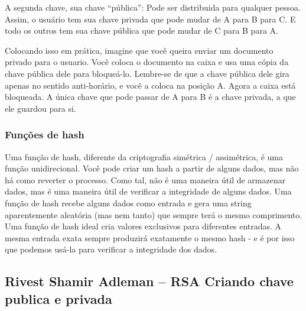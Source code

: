 A segunda chave, sua chave ``pública'': Pode ser distribuida para qualquer pessoa. Assim, o usuário tem sua chave privada que pode mudar de A para B para C. E todo os outros tem sua chave pública que pode mudar de C para B para A.

Colocando isso em prática, imagine que você queira enviar um documento privado para o usuario. Você coloca o documento na caixa e usa uma cópia da chave pública dele para bloqueá-lo. Lembre-se de que a chave pública dele gira apenas no sentido anti-horário, e você a coloca na posição A. Agora a caixa está bloqueada. A única chave que pode passar de A para B é a chave privada, a que ele guardou para si.

\subsubsection{Funções de hash}
Uma função de hash, diferente da criptografia simétrica / assimétrica, é uma função unidirecional. Você pode criar um hash a partir de alguns dados, mas não há como reverter o processo. Como tal, não é uma maneira útil de armazenar dados, mas é uma maneira útil de verificar a integridade de alguns dados.
Uma função de hash recebe alguns dados como entrada e gera uma string aparentemente aleatória (mas nem tanto) que sempre terá o mesmo comprimento. Uma função de hash ideal cria valores exclusivos para diferentes entradas. A mesma entrada exata sempre produzirá exatamente o mesmo hash - e é por isso que podemos usá-la para verificar a integridade dos dados.

\subsection{Rivest Shamir Adleman – RSA Criando chave publica e privada}


